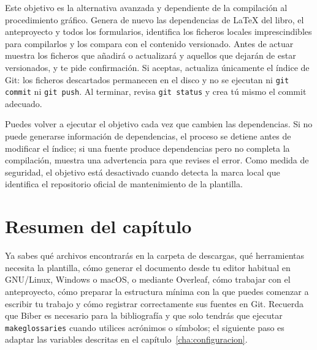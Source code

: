 Este objetivo es la alternativa avanzada y dependiente de la compilación al procedimiento gráfico. Genera de nuevo las dependencias de \LaTeX{} del libro, el anteproyecto y todos los formularios, identifica los ficheros locales imprescindibles para compilarlos y los compara con el contenido versionado. Antes de actuar muestra los ficheros que añadirá o actualizará y aquellos que dejarán de estar versionados, y te pide confirmación. Si aceptas, actualiza únicamente el índice de Git: los ficheros descartados permanecen en el disco y no se ejecutan ni \texttt{git commit} ni \texttt{git push}. Al terminar, revisa \texttt{git status} y crea tú mismo el commit adecuado.

Puedes volver a ejecutar el objetivo cada vez que cambien las dependencias. Si no puede generarse información de dependencias, el proceso se detiene antes de modificar el índice; si una fuente produce dependencias pero no completa la compilación, muestra una advertencia para que revises el error. Como medida de seguridad, el objetivo está desactivado cuando detecta la marca local que identifica el repositorio oficial de mantenimiento de la plantilla.

\section{Resumen del capítulo}
\label{sec:resumen-primeros-pasos}

Ya sabes qué archivos encontrarás en la carpeta de descargas, qué herramientas necesita la plantilla, cómo generar el documento desde tu editor habitual en GNU/Linux, Windows o macOS, o mediante Overleaf, cómo trabajar con el anteproyecto, cómo preparar la estructura mínima con la que puedes comenzar a escribir tu trabajo y cómo registrar correctamente sus fuentes en Git. Recuerda que Biber es necesario para la bibliografía y que solo tendrás que ejecutar \texttt{makeglossaries} cuando utilices acrónimos o símbolos; el siguiente paso es adaptar las variables descritas en el capítulo~\ref{cha:configuracion}.








